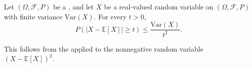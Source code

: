\begin{proposition} \label{proposition:chebyshev_inequality_for_random_variables_with_finite_variance}
Let $(\Omega, \mathcal{F}, P)$ be a , and let $X$ be a real-valued random variable on $(\Omega, \mathcal{F}, P)$ with finite variance $\mathrm{Var}(X)$. For every $t > 0$,
$$P(|X - \mathbb{E}[X]| \geq t) \leq \frac{\mathrm{Var}(X)}{t^2}.$$

This follows from the  applied to the nonnegative random variable $(X - \mathbb{E}[X])^2$.
\end{proposition}
